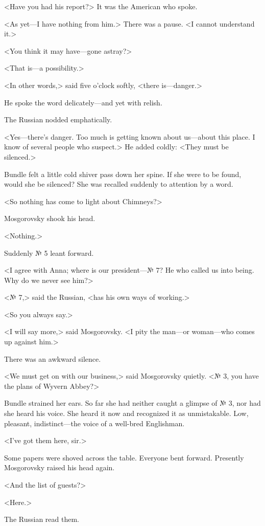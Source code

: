 <Have you had his report?> It was the American who spoke.

<As yet—I have nothing from him.> There was a pause. <I cannot understand it.>

<You think it may have—gone astray?>

<That is—a possibility.>

<In other words,> said five o'clock softly, <there is—danger.>

He spoke the word delicately—and yet with relish.

The Russian nodded emphatically.

<Yes—there's danger. Too much is getting known about us—about this place. I know of several people who suspect.> He added coldly: <They must be silenced.>

Bundle felt a little cold shiver pass down her spine. If she were to be found, would she be silenced? She was recalled suddenly to attention by a word.

<So nothing has come to light about Chimneys?>

Mosgorovsky shook his head.

<Nothing.>

Suddenly № 5 leant forward.

<I agree with Anna; where is our president—№ 7? He who called us into being. Why do we never see him?>

<№ 7,> said the Russian, <has his own ways of working.>

<So you always say.>

<I will say more,> said Mosgorovsky. <I pity the man—or woman—who comes up against him.>

There was an awkward silence.

<We must get on with our business,> said Mosgorovsky quietly. <№ 3, you have the plans of Wyvern Abbey?>

Bundle strained her ears. So far she had neither caught a glimpse of № 3, nor had she heard his voice. She heard it now and recognized it as unmistakable. Low, pleasant, indistinct—the voice of a well-bred Englishman.

<I've got them here, sir.>

Some papers were shoved across the table. Everyone bent forward. Presently Mosgorovsky raised his head again.

<And the list of guests?>

<Here.>

The Russian read them.

